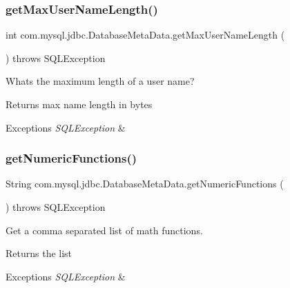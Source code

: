 \subsubsection{\texorpdfstring{get\+Max\+User\+Name\+Length()}{getMaxUserNameLength()}}
{\footnotesize\ttfamily int com.\+mysql.\+jdbc.\+Database\+Meta\+Data.\+get\+Max\+User\+Name\+Length (\begin{DoxyParamCaption}{ }\end{DoxyParamCaption}) throws S\+Q\+L\+Exception}

What\textquotesingle{}s the maximum length of a user name?

\begin{DoxyReturn}{Returns}
max name length in bytes 
\end{DoxyReturn}

\begin{DoxyExceptions}{Exceptions}
{\em S\+Q\+L\+Exception} & \\
\hline
\end{DoxyExceptions}
\mbox{\label{classcom_1_1mysql_1_1jdbc_1_1_database_meta_data_aa6ed04ec922adf87e5d0ce4a3dfe1fed}} 
\subsubsection{\texorpdfstring{get\+Numeric\+Functions()}{getNumericFunctions()}}
{\footnotesize\ttfamily String com.\+mysql.\+jdbc.\+Database\+Meta\+Data.\+get\+Numeric\+Functions (\begin{DoxyParamCaption}{ }\end{DoxyParamCaption}) throws S\+Q\+L\+Exception}

Get a comma separated list of math functions.

\begin{DoxyReturn}{Returns}
the list 
\end{DoxyReturn}

\begin{DoxyExceptions}{Exceptions}
{\em S\+Q\+L\+Exception} & \\
\hline
\end{DoxyExceptions}
\mbox{\label{classcom_1_1mysql_1_1jdbc_1_1_database_meta_data_a46c186ab0bcdea0569100f0147339544}} 
